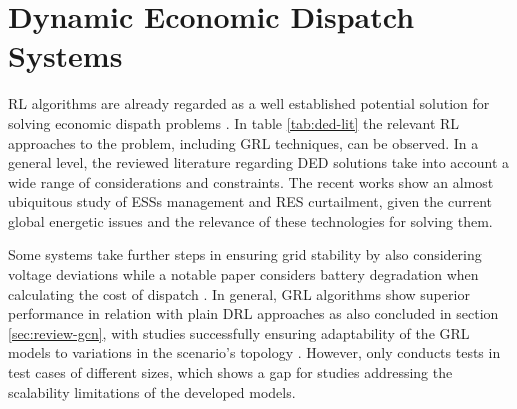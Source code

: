 \section{Dynamic Economic Dispatch Systems} \label{sec:review-ded}

\ac{RL} algorithms are already regarded as a well established potential solution for solving economic dispath problems \cite{pereraApplicationsReinforcementLearning2021}. In table \ref{tab:ded-lit} the relevant \ac{RL} approaches to the problem, including \ac{GRL} techniques, can be observed. In a general level, the reviewed literature regarding \ac{DED} solutions take into account a wide range of considerations and constraints. The recent works show an almost ubiquitous study of \acp{ESS} management and \ac{RES} curtailment, given the current global energetic issues and the relevance of these technologies for solving them. \par
Some systems \cite{chenScalableGraphReinforcement2023, hanAutonomousControlTechnology2023, zhaoGraphbasedDeepReinforcement2022} take further steps in ensuring grid stability by also considering voltage deviations while a notable paper considers battery degradation when calculating the cost of dispatch \cite{liuDistributedEconomicDispatch2018}. In general, \ac{GRL} algorithms show superior performance in relation with plain \ac{DRL} approaches \cite{chenScalableGraphReinforcement2023, liNovelGraphReinforcement2022, zhaoGraphbasedDeepReinforcement2022} as also concluded in section \ref{sec:review-gcn}, with studies successfully ensuring adaptability of the \ac{GRL} models to variations in the scenario's topology \cite{chenScalableGraphReinforcement2023, zhaoGraphbasedDeepReinforcement2022}. However, only \cite{baiAdaptiveActivePower2023b} conducts tests in test cases of different sizes, which shows a gap for studies addressing the scalability limitations of the developed models.



